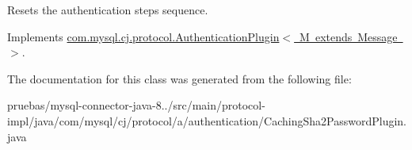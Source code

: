 Resets the authentication steps sequence. 

Implements \mbox{\hyperlink{interfacecom_1_1mysql_1_1cj_1_1protocol_1_1_authentication_plugin_a504193fb759e76fedc7ca7b00effb44d}{com.\+mysql.\+cj.\+protocol.\+Authentication\+Plugin$<$ M extends Message $>$}}.



The documentation for this class was generated from the following file\+:\begin{DoxyCompactItemize}
\item 
pruebas/mysql-\/connector-\/java-\/8../src/main/protocol-\/impl/java/com/mysql/cj/protocol/a/authentication/Caching\+Sha2\+Password\+Plugin.\+java\end{DoxyCompactItemize}
